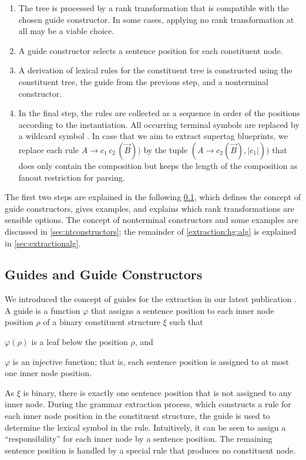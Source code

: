 \documentclass[../../document.tex]{subfiles}
\begin{document}
    \begin{enumerate}
        \item\label{extraction:hg:ranktrans}
            The tree is processed by a rank transformation that is compatible with the chosen guide constructor.
            In some cases, applying no rank transformation at all may be a viable choice.
        \item\label{extraction:hg:guide}
            A guide constructor selects a sentence position for each constituent node.
        \item\label{extraction:hg:alg}
            A derivation of lexical  rules for the constituent tree is constructed using the constituent tree, the guide from the previous step, and a nonterminal constructor.
        \item
            In the final step, the rules are collected as a sequence in order of the positions according to the instantiation.
            All occurring terminal symbols are replaced by a wildcard symbol \tn{*}.
            In case that we aim to extract  supertag blueprints, we replace each  rule \(A \to c_1\,c_2\,(\vec{B}))\) by the tuple \((A \to c_2 (\vec{B}), |c_1|))\) that does only contain the  composition but keeps the length of the  composition as fanout restriction for parsing.
    \end{enumerate}
    The first two steps are explained in the following \cref{sec:guides}, which defines the concept of guide constructors, gives examples, and explains which rank transformations are sensible options.
    The concept of nonterminal constructors and some examples are discussed in \cref{sec:ntconstructors}; the remainder of \cref{extraction:hg:alg} is explained in \cref{sec:extractionalg}.

    \subsection{Guides and Guide Constructors}\label{sec:guides}
    We introduced the concept of guides for the extraction in our latest publication \citep{Rup22}.
    A guide is a function \(\varphi\) that assigns a sentence position to each inner node position \(\rho\) of a binary constituent structure \(\xi\) such that
    \begin{inparaenum}
        \item \(\varphi(\rho)\) is a leaf below the position \(\rho\), and
        \item \(\varphi\) is an injective function; that is, each sentence position is assigned to at most one inner node position.
    \end{inparaenum}
    As \(\xi\) is binary, there is exactly one sentence position that is not assigned to any inner node.
    During the grammar extraction process, which constructs a rule for each inner node position in the constituent structure, the guide is used to determine the lexical symbol in the rule.
    Intuitively, it can be seen to assign a ``responsibility'' for each inner node by a sentence position.
    The remaining sentence position is handled by a special rule that produces no constituent node.
\end{document}
